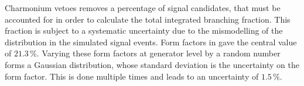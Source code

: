 Charmonium vetoes removes a percentage of signal candidates, that must be accounted for in order to
calculate the total integrated branching fraction.
This fraction is subject to a systematic uncertainty due to the mismodelling of the \qsq
distribution in the simulated signal events.
Form factors in  gave the central value of $21.3\,\%$.
Varying these form factors at generator level by a random number forms a Gaussian distribution,
whose standard deviation is the uncertainty on the form factor.
This is done multiple times and leads to an uncertainty of $1.5\,\%$.











